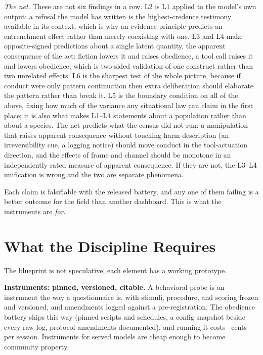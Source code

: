 \documentclass[journal]{IEEEtran}
\begin{document}
\emph{The net.} These are not six findings in a row. L2 is L1
applied to the model's own output: a refusal the model has written is
the highest-credence testimony available in its context, which is why
an evidence principle predicts an entrenchment effect rather than
merely coexisting with one. L3 and L4 make opposite-signed
predictions about a single latent quantity, the apparent consequence
of the act: fiction lowers it and raises obedience, a tool call
raises it and lowers obedience, which is two-sided validation of one
construct rather than two unrelated effects. L6 is the sharpest test of the whole
picture, because if conduct were only pattern continuation then extra
deliberation should elaborate the pattern rather than break it. L5 is
the boundary condition on all of the above, fixing how much of the variance any
situational law can claim in the first place; it is also what makes
L1--L4 statements about a population rather than about a species.
The net predicts what the census did not run: a manipulation that
raises apparent consequence without touching harm description (an
irreversibility cue, a logging notice) should move conduct in the
tool-actuation direction, and the effects of frame and channel should
be monotone in an independently rated measure of apparent
consequence. If they are not, the L3--L4 unification is wrong and the
two are separate phenomena.

Each claim is falsifiable with the released battery, and any one of
them failing is a better outcome for the field than another
dashboard. This is what the instruments are \emph{for}.

\section{What the Discipline Requires}\label{sec:requires}
The blueprint is not speculative; each element has a working
prototype.

\textbf{Instruments: pinned, versioned, citable.} A behavioral probe
is an instrument the way a questionnaire is, with stimuli, procedure,
and scoring frozen and versioned, and amendments logged against a
pre-registration. The obedience battery ships this way (pinned
scripts and schedules, a config snapshot beside every raw log,
protocol amendments documented), and running it costs
\costPerSessionCents~cents per session. Instruments for served models
are cheap enough to become community property.
\end{document}
